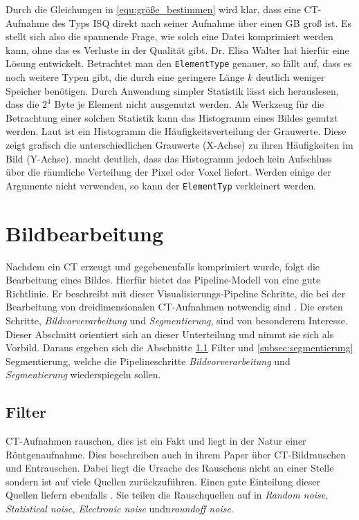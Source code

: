 Durch die Gleichungen in \ref{equ:größe_bestimmen} wird klar, dass eine \ac{CT}-Aufnahme
des Typs \ac{ISQ} direkt nach seiner Aufnahme über einen \ac{GB} groß ist. Es
stellt sich also die spannende Frage, wie solch eine Datei komprimiert werden kann,
ohne das es Verluste in der Qualität gibt. Dr. Elisa Walter hat hierfür eine
Lösung entwickelt. Betrachtet man den \texttt{ElementType} genauer, so fällt auf,
dass es noch weitere Typen gibt, die durch eine geringere Länge $k$ deutlich weniger
Speicher benötigen. Durch Anwendung simpler Statistik lässt sich herauslesen, dass
die $2^{4}$ Byte je Element nicht ausgenutzt werden. Als Werkzeug für die
Betrachtung einer solchen Statistik kann das Histogramm eines Bildes genutzt
werden. Laut \citet[S.~249]{jahne2024} ist ein Histogramm die
Häufigkeitsverteilung der Grauwerte. Diese zeigt grafisch die unterschiedlichen Grauwerte
(X-Achse) zu ihren Häufigkeiten im Bild (Y-Achse). \citet[S.~249]{jahne2024} macht
deutlich, dass das Histogramm jedoch kein Aufschluss über die räumliche
Verteilung der Pixel oder Voxel liefert. Werden einige der Argumente nicht verwenden,
so kann der \texttt{ElementTyp} verkleinert werden.

\section{Bildbearbeitung}
\label{sec:bildbearbeitung} Nachdem ein \ac{CT} erzeugt und gegebenenfalls
komprimiert wurde, folgt die Bearbeitung eines Bildes. Hierfür bietet das
Pipeline-Modell von \citet[S.~50]{handels2000} eine gute Richtlinie. Er
beschreibt mit dieser Visualisierungs-Pipeline Schritte, die bei der Bearbeitung
von dreidimensionalen \ac{CT}-Aufnahmen notwendig sind \citep[vgl.][S.~50]{handels2000}.
Die ersten Schritte, \textit{Bildvorverarbeitung} und \textit{Segmentierung},
sind von besonderem Interesse. Dieser Abschnitt orientiert sich an dieser Unterteilung
und nimmt sie sich als Vorbild. Daraus ergeben sich die Abschnitte
\ref{subsec:filter} Filter und \ref{subsec:segmentierung} Segmentierung, welche die
Pipelineschritte \textit{Bildvorverarbeitung} und \textit{Segmentierung} wiederspiegeln
sollen.

\subsection{Filter}
\label{subsec:filter} \ac{CT}-Aufnahmen rauschen, dies ist ein Fakt und liegt in
der Natur einer Röntgenaufnahme. Dies beschreiben auch \citet[K.~3]{diwakar2018}
in ihrem Paper über \ac{CT}-Bildrauschen und Entrauschen. Dabei liegt die Ursache
des Rauschens nicht an einer Stelle sondern ist auf viele Quellen zurückzuführen.
Einen gute Einteilung dieser Quellen liefern ebenfalls \citet[K.~3]{diwakar2018}.
Sie teilen die Rauschquellen auf in \textit{Random noise, Statistical noise,
Electronic noise} undn\textit{roundoff noise}.

